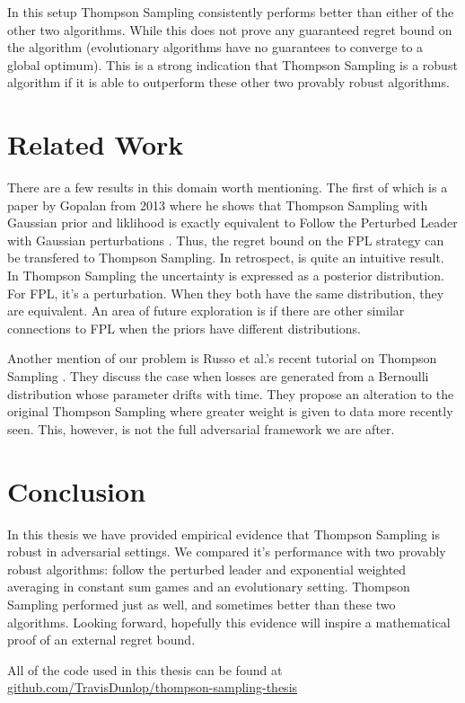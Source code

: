 \documentclass[10pt,a4paper]{article} %
\begin{document}
	In this setup Thompson Sampling consistently performs better than either of the other two algorithms.  While this does not prove any guaranteed regret bound on the algorithm (evolutionary algorithms have no guarantees to converge to a global optimum).  This is a strong indication that Thompson Sampling is a robust algorithm if it is able to outperform these other two provably robust algorithms.

	\section{Related Work}
	
	There are a few results in this domain worth mentioning.  The first of which is a paper by Gopalan from 2013 where he shows that Thompson Sampling with Gaussian prior and liklihood is exactly equivalent to Follow the Perturbed Leader with Gaussian perturbations \cite{FPL_TS_Gaussian}.  Thus, the regret bound on the FPL strategy can be transfered to Thompson Sampling.  In retrospect, is quite an intuitive result.  In Thompson Sampling the uncertainty is expressed as a posterior distribution. For FPL, it's a perturbation.  When they both have the same distribution, they are equivalent. 	An area of future exploration is if there are other similar connections to FPL when the priors have different distributions.
	
	Another mention of our problem is Russo et al.'s recent tutorial on Thompson Sampling \cite{Russo_TS}.  They discuss the case when losses are generated from a Bernoulli distribution whose parameter drifts with time.  They propose an alteration to the original Thompson Sampling where greater weight is given to data more recently seen.  This, however, is not the full adversarial framework we are after.

	\section{Conclusion}
	
	In this thesis we have provided empirical evidence that Thompson Sampling is robust in adversarial settings.  We compared it's performance with two provably robust algorithms: follow the perturbed leader and exponential weighted averaging in constant sum games and an evolutionary setting.  Thompson Sampling performed just as well, and sometimes better than these two algorithms.  Looking forward, hopefully this evidence will inspire a mathematical proof of an external regret bound.
	
	All of the code used in this thesis can be found at \url{github.com/TravisDunlop/thompson-sampling-thesis}
	
	
	\nocite{*}
	
	
\end{document}
